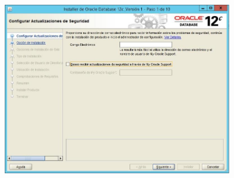 \begin{enumerate}[1.]
	\begin{center}
	\includegraphics[width=10cm]{./Imagenes/jhordy8} 
	\end{center}
	
\end{enumerate} 

